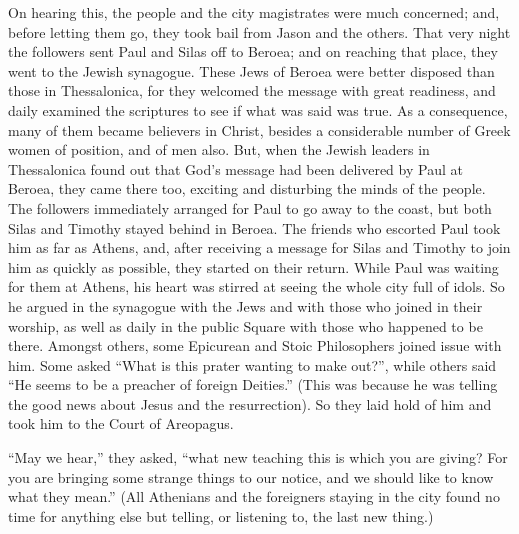  On hearing this, the people and the city magistrates were
much concerned;  and, before letting them go, they took bail
from Jason and the others.  That very night the followers
sent Paul and Silas off to Beroea; and on reaching that place, they went
to the Jewish synagogue.  These Jews of Beroea were better
disposed than those in Thessalonica, for they welcomed the message with
great readiness, and daily examined the scriptures to see if what was
said was true.  As a consequence, many of them became
believers in Christ, besides a considerable number of Greek women of
position, and of men also.  But, when the Jewish leaders in
Thessalonica found out that God's message had been delivered by Paul at
Beroea, they came there too, exciting and disturbing the minds of the
people.  The followers immediately arranged for Paul to go
away to the coast, but both Silas and Timothy stayed behind in Beroea.
 The friends who escorted Paul took him as far as Athens,
and, after receiving a message for Silas and Timothy to join him as
quickly as possible, they started on their return.  While
Paul was waiting for them at Athens, his heart was stirred at seeing the
whole city full of idols.  So he argued in the synagogue
with the Jews and with those who joined in their worship, as well as
daily in the public Square with those who happened to be there.
 Amongst others, some Epicurean and Stoic Philosophers
joined issue with him. Some asked ``What is this prater wanting to make
out?'', while others said ``He seems to be a preacher of foreign
Deities.'' (This was because he was telling the good news about Jesus
and the resurrection).  So they laid hold of him and took
him to the Court of Areopagus.

``May we hear,'' they asked, ``what new teaching this is which you are
giving?  For you are bringing some strange things to our
notice, and we should like to know what they mean.''  (All
Athenians and the foreigners staying in the city found no time for
anything else but telling, or listening to, the last new thing.)

